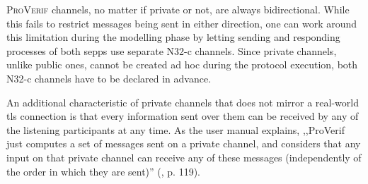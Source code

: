 \textsc{ProVerif} channels, no matter if private or not, are always bidirectional.
While this fails to restrict messages being sent in either direction, one can work around this limitation during the modelling phase by letting sending and responding processes of both \glspl{sepp} use separate N32-c channels.
Since private channels, unlike public ones, cannot be created ad hoc during the protocol execution, both N32-c channels have to be declared in advance.

An additional characteristic of private channels that does not mirror a real-world \gls{tls} connection is that every information sent over them can be received by any of the listening participants at any time.
As the user manual explains, ,,ProVerif just computes a set of messages sent on a private channel, and considers that any input on that private channel can receive any of these messages (independently of the order in which
they are sent)'' (\cite{blanchet2020proverif}, p. 119).